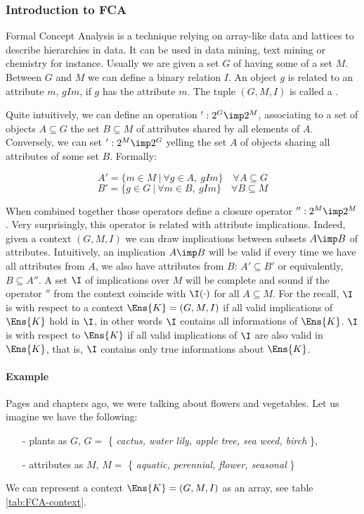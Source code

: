 \subsubsection{Introduction to FCA}

Formal Concept Analysis is a technique relying on array-like data and lattices
to describe hierarchies in data. It can be used in data mining, text mining or
chemistry for instance. Usually we are given a set $G$ of  having some  of a set $M$. Between $G$ and $M$ we can define
a binary relation $I$. An object $g$ is related to an attribute $m$, $gIm$, if
$g$ has the attribute $m$. The tuple $(G, M, I)$ is called a .

\vspace{1.2em}

Quite intuitively, we can define an operation $': 2^G \imp 2^M$, associating to a set of objects $A \subseteq G$ the set $B \subseteq M$ of attributes shared by
all elements of $A$. Conversely, we can set $': 2^M \imp 2^G$ yelling the set
$A$ of objects sharing all attributes of some set $B$. Formally:

\[ A' = \{ m \in M \ | \ \forall g \in A,\ gIm \} \quad \forall A \subseteq G \]
\[ B' = \{ g \in G \ | \ \forall m \in B,\ gIm \} \quad \forall B \subseteq M \]


\noindent When combined together those operators define a closure operator $'': 2^M \imp 2^M$. Very surprisingly, this operator is related with attribute implications. Indeed, given a context $(G, M, I)$ we can draw implications between subsets $A \imp B$ of attributes. Intuitively, an implication $A \imp B$ will be valid if every time we have all attributes from $A$, we also have
attributes from $B$: $A' \subseteq B'$ or equivalently, $B \subseteq A''$. A set
$\I$ of implications over $M$ will be complete and sound if the operator $''$ from the context coincide with $\I(\cdot)$ for all $A \subseteq M$. For the recall, $\I$ is  with respect to a context $\Ens{K} = (G, M, I)$ if all valid implications of $\Ens{K}$ hold in $\I$, in other words $\I$ contains all informations of $\Ens{K}$. $\I$ is  with respect to
$\Ens{K}$ if all valid implications of $\I$ are also valid in $\Ens{K}$, that is, $\I$ contains only true informations about $\Ens{K}$. 


\paragraph{Example} Pages and chapters ago, we were talking about flowers and
vegetables. Let us imagine we have the following:
\begin{itemize}
	\item[-] plants as $G$, $G = $ \{ \textit{cactus, water lily, apple tree, sea weed, birch} \},
	\item[-] attributes as $M$, $M = $ \{ \textit{aquatic, perennial, flower, seasonal} \}
\end{itemize}
We can represent a context $\Ens{K} = (G, M, I)$ as an array, see table \ref{tab:FCA-context}.

